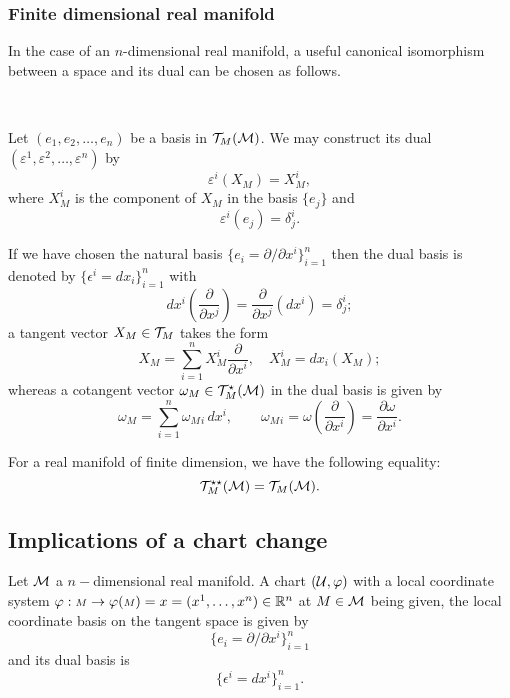 \subsubsection{\bf Finite dimensional real manifold}
In the case of  an $n$-dimensional real manifold,
a useful canonical isomorphism between a space and its dual can be chosen as follows.

\, 

Let
$(e_1,e_2,\dots,e_n)$ be a basis in  $\mathcal{T}_{\scriptstyle M}(\mathcal{M})$.  We may construct its dual
$(\varepsilon^1,\varepsilon^2,\dots,\varepsilon^n)$ by
\begin{equation}
\varepsilon^i(X_{\scriptstyle M})= X^i_{\scriptstyle M}, 
\end{equation}
where $X^i_{\scriptstyle M}$ is the component of $X_{\scriptstyle M}$ in the basis $\{e_j\}$ and 
\begin{equation}
\varepsilon^i(e_j)= \delta^i_j.
\end{equation}

If we have chosen the natural basis $\{e_{i}=\partial/\partial x^i\}_{i=1}^{n}$ then the dual basis is denoted by  $\{\epsilon^{i}=dx_{i}\}_{i=1}^{n}$ with
\begin{equation}
dx^i\left(\frac{\partial}{\partial x^j}\right) =\frac{\partial}{\partial x^j}(dx^i)=\delta^i_j;
\end{equation}
a tangent vector $X_{\scriptstyle M}\in \mathcal{T}_{\scriptstyle M}$ takes the form
\[
X_{\scriptstyle M} = \sum_{i=1}^n X^{i}_{\scriptstyle M}\frac{\partial}{\partial x^{i}},\quad X^{i}_{\scriptstyle M}=dx_{i}(X_{\scriptstyle M});
\]
whereas a cotangent vector $\omega_{\scriptstyle M} \in \mathcal{T}_{\scriptstyle M}^\star(\mathcal{M})$ in the dual basis is given by
\[
\omega_{\scriptstyle M} = \sum_{i=1}^n \omega_{\scriptstyle M}{}_i\, dx^{i},\qquad  \omega_{\scriptstyle M}{}_i=\omega\left(\frac{\partial}{\partial x^{i}}\right)=\frac{\partial \omega}{\partial x^{i}}.
\]


For a real manifold of finite dimension, we have the following equality:
\begin{equation}
\mathcal{T}^{\star \star}_{\scriptstyle M}(\mathcal{M})= \mathcal{T}_{\scriptstyle M}(\mathcal{M}).
\end{equation}

\subsection{Implications of a chart change}

Let $ \mathcal{M}$ a $n-$dimensional real manifold. A chart $(\mathcal{U},\varphi)$ with a local coordinate system $\varphi:{\scriptstyle M}\to \varphi({\scriptstyle M})=x=(x^1,\dots,x^n)\in \mathbb{R}^n$  at $M \in \mathcal{M}$ being given, the local coordinate basis on the tangent space is given by   \[\{e_{i}=\partial/\partial x^{i}\}_{i=1}^{n}\]  and its dual basis is \[\{\epsilon^{i}=dx^{i}\}_{i=1}^{n}.\]  


